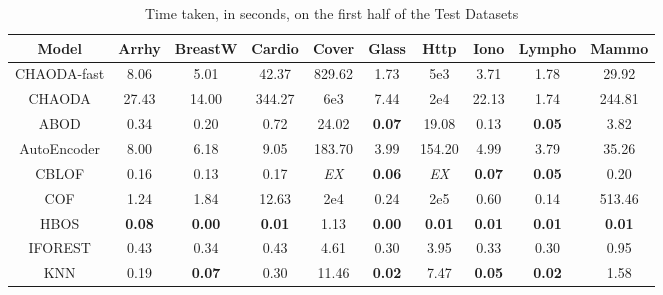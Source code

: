 \begin{table}[!t]
\renewcommand{\arraystretch}{1.15}
\caption{Time taken, in seconds, on the first half of the Test Datasets}
\label{supplement:table:results:test-time-1}
\vskip 0.15in
\begin{center}
\begin{small}
\begin{tabular}{|c|c|c|c|c|c|c|c|c|c|}
\hline
\textbf{Model} & \textbf{Arrhy} & \textbf{BreastW} & \textbf{Cardio} & \textbf{Cover} & \textbf{Glass} & \textbf{Http} & \textbf{Iono} & \textbf{Lympho} & \textbf{Mammo} \\
\hline
CHAODA-fast    & 8.06           & 5.01             & 42.37           & 829.62         & 1.73           & 5e3           & 3.71          & 1.78            & 29.92          \\
\hline
CHAODA         & 27.43          & 14.00            & 344.27          & 6e3            & 7.44           & 2e4           & 22.13         & 1.74            & 244.81         \\
\hline
ABOD &                0.34 &             0.20 &            0.72 &          24.02 &  \textbf{0.07} &         19.08 &                0.13 &   \textbf{0.05} &           3.82 \\
\hline
AutoEncoder &                8.00 &             6.18 &            9.05 &         183.70 &           3.99 &        154.20 &                4.99 &            3.79 &          35.26 \\
\hline
CBLOF &                0.16 &             0.13 &            0.17 &    \textit{EX} &  \textbf{0.06} &   \textit{EX} &       \textbf{0.07} &   \textbf{0.05} &           0.20 \\
\hline
COF &                1.24 &             1.84 &           12.63 &       2e4 &           0.24 &      2e5 &                0.60 &            0.14 &         513.46 \\
\hline
HBOS &       \textbf{0.08} &    \textbf{0.00} &   \textbf{0.01} &           1.13 &  \textbf{0.00} & \textbf{0.01} &       \textbf{0.01} &   \textbf{0.01} &  \textbf{0.01} \\
\hline
IFOREST &                0.43 &             0.34 &            0.43 &           4.61 &           0.30 &          3.95 &                0.33 &            0.30 &           0.95 \\
\hline
KNN &                0.19 &    \textbf{0.07} &            0.30 &          11.46 &  \textbf{0.02} &          7.47 &       \textbf{0.05} &   \textbf{0.02} &           1.58 \\

\end{tabular}
\end{small}
\end{center}
\end{table}
